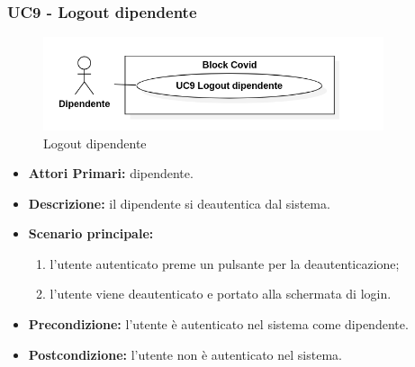 \subsubsection{ UC9 - Logout dipendente}
\begin{figure}[H]
	\centering
	\includegraphics[width=10cm]{res/images/UC9.png}
	\caption{Logout dipendente}
\end{figure}
\begin{itemize}
	\item\textbf{Attori Primari:} 
	dipendente.
	\item\textbf{Descrizione:} 
	il dipendente si deautentica dal sistema.
	\item\textbf{Scenario principale:} 
	\begin{enumerate}
		\item l'utente autenticato preme un pulsante per la deautenticazione;
		\item l'utente viene deautenticato e portato alla schermata di login.
	\end{enumerate}
	\item\textbf{Precondizione:} 
	l'utente è autenticato nel sistema come dipendente.
	\item\textbf{Postcondizione:}
	l'utente non è autenticato nel sistema.
\end{itemize}

